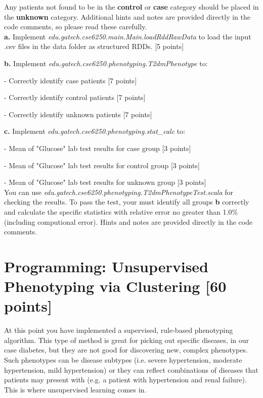 \documentclass[12pt]{article}
\begin{document}
Any patients not found to be in the \textbf{control} or \textbf{case} category should be placed in the \textbf{unknown} category. Additional hints and notes are provided directly in the code comments, so please read these carefully. \\

\textbf{a.} Implement \textit{edu.gatech.cse6250.main.Main.loadRddRawData} to load the input .csv files in the data folder as structured RDDs. [5 points]
\newline

\textbf{b.}  Implement \textit{edu.gatech.cse6250.phenotyping.T2dmPhenotype} to:

 - Correctly identify case patients [7 points]
 
 - Correctly identify control patients [7 points]
 
 - Correctly identify unknown patients [7 points]
\newline

\textbf{c.} Implement  \textit{edu.gatech.cse6250.phenotyping.stat\_calc} to:

 - Mean of "Glucose" lab test results for case group [3 points]
 
 - Mean of "Glucose" lab test results for control group [3 points]
  
 - Mean of "Glucose" lab test results for unknown group [3 points]\\
   
You can use \textit{edu.gatech.cse6250.phenotyping.T2dmPhenotypeTest.scala} for checking the results. To pass the test, your must identify all groups \textbf{b} correctly and calculate the specific statistics with relative error no greater than 1.0\% (including computional error). Hints and notes are provided directly in the code comments.
 
\section{Programming: Unsupervised Phenotyping via Clustering [60 points]}
At this point you have implemented a supervised, rule-based phenotyping algorithm. This type of method is great for picking out specific diseases, in our case diabetes, but they are not good for discovering new, complex phenotypes. Such phenotypes can be disease subtypes (i.e. severe hypertension, moderate hypertension, mild hypertension) or they can reflect combinations of diseases that patients may present with (e.g. a patient with hypertension and renal failure). This is where unsupervised learning comes in.
\end{document}
